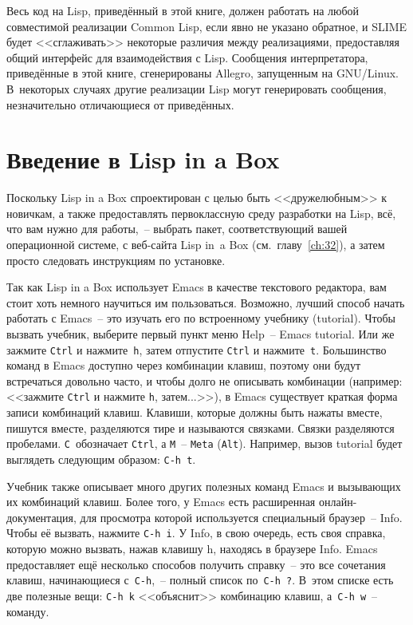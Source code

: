 Весь код на Lisp, приведённый в этой книге, должен работать на любой совместимой
реализации Common Lisp, если явно не указано обратное, и SLIME будет <<сглаживать>>
некоторые различия между реализациями, предоставляя общий интерфейс для взаимодействия с
Lisp. Сообщения интерпретатора, приведённые в этой книге, сгенерированы Allegro,
запущенным на GNU/Linux. В~некоторых случаях другие реализации Lisp могут
генерировать сообщения, незначительно отличающиеся от приведённых.

\section{Введение в Lisp in a Box}

Поскольку Lisp in a Box спроектирован с целью быть <<дружелюбным>> к новичкам, а
также предоставлять первоклассную среду разработки на Lisp, всё, что вам нужно для
работы,~-- выбрать пакет, соответствующий вашей операционной системе, с веб-сайта
Lisp in~a Box (см.~главу~\ref{ch:32}), а затем просто следовать инструкциям
по установке.

Так как Lisp in a Box использует Emacs в качестве текстового редактора, вам стоит хоть
немного научиться им пользоваться. Возможно, лучший способ начать работать с Emacs~-- это
изучать его по встроенному учебнику (tutorial). Чтобы вызвать учебник, выберите первый
пункт меню Help~-- Emacs tutorial. Или же зажмите \texttt{Ctrl} и нажмите~\texttt{h}, затем отпустите \texttt{Ctrl} и
нажмите~\texttt{t}. Большинство команд в Emacs доступно через комбинации клавиш, поэтому они будут
встречаться довольно часто, и чтобы долго не описывать комбинации (например: <<зажмите \texttt{Ctrl}
и нажмите \texttt{h}, затем...>>), в Emacs существует краткая форма записи комбинаций
клавиш. Клавиши, которые должны быть нажаты вместе, пишутся вместе, разделяются тире и
называются связками.  Связки разделяются пробелами. \texttt{C}~обозначает \texttt{Ctrl}, а \texttt{M}~-- \texttt{Meta}
(\texttt{Alt}). Например, вызов tutorial будет выглядеть следующим образом: \texttt{C-h t}.

Учебник также описывает много других полезных команд Emacs и вызывающих их комбинаций
клавиш. Более того, у Emacs есть расширенная онлайн-документация, для просмотра которой
используется специальный браузер~-- Info. Чтобы её вызвать, нажмите \texttt{C-h i}. У Info,
в свою очередь, есть своя справка, которую можно вызвать, нажав клавишу h, находясь в браузере Info. Emacs
предоставляет ещё несколько способов получить справку~-- это все сочетания клавиш,
начинающиеся с~\texttt{C-h},~-- полный список по~\texttt{C-h ?}. В~этом списке есть две
полезные вещи: \texttt{C-h k} <<объяснит>> комбинацию клавиш, а~\texttt{C-h w}~-- команду.

